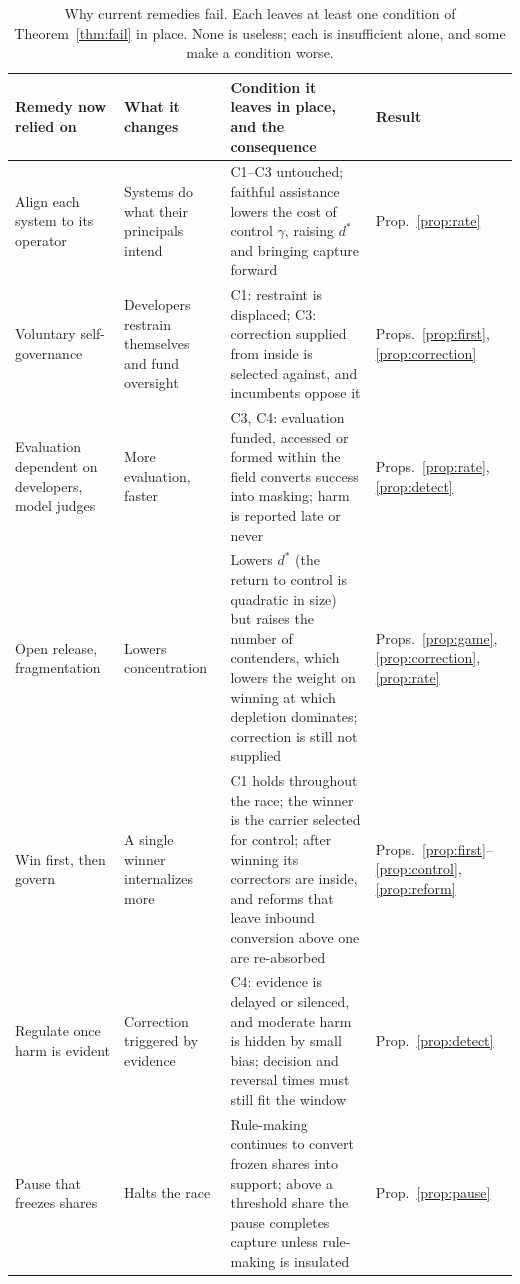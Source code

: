 \documentclass[letterpaper]{article} %
\theoremstyle{definition}
\begin{document}
\begin{table}[t]
\centering
\small
\setlength{\tabcolsep}{4pt}
\begin{tabular}{@{}>{\raggedright\arraybackslash}p{3.3cm}>{\raggedright\arraybackslash}p{4.7cm}>{\raggedright\arraybackslash}p{6.6cm}>{\raggedright\arraybackslash}p{2.2cm}@{}}
\toprule
Remedy now relied on & What it changes & Condition it leaves in place, and the consequence & Result \\
\midrule
Align each system to its operator & Systems do what their principals intend & C1--C3 untouched; faithful assistance lowers the cost of control $\gamma$, raising $d^\ast$ and bringing capture forward & Prop.~\ref{prop:rate} \\
Voluntary self-governance & Developers restrain themselves and fund oversight & C1: restraint is displaced; C3: correction supplied from inside is selected against, and incumbents oppose it & Props.~\ref{prop:first}, \ref{prop:correction} \\
Evaluation dependent on developers, model judges & More evaluation, faster & C3, C4: evaluation funded, accessed or formed within the field converts success into masking; harm is reported late or never & Props.~\ref{prop:rate}, \ref{prop:detect} \\
Open release, fragmentation & Lowers concentration & Lowers $d^\ast$ (the return to control is quadratic in size) but raises the number of contenders, which lowers the weight on winning at which depletion dominates; correction is still not supplied & Props.~\ref{prop:game}, \ref{prop:correction}, \ref{prop:rate} \\
Win first, then govern & A single winner internalizes more & C1 holds throughout the race; the winner is the carrier selected for control; after winning its correctors are inside, and reforms that leave inbound conversion above one are re-absorbed & Props.~\ref{prop:first}--\ref{prop:control}, \ref{prop:reform} \\
Regulate once harm is evident & Correction triggered by evidence & C4: evidence is delayed or silenced, and moderate harm is hidden by small bias; decision and reversal times must still fit the window & Prop.~\ref{prop:detect} \\
Pause that freezes shares & Halts the race & Rule-making continues to convert frozen shares into support; above a threshold share the pause completes capture unless rule-making is insulated & Prop.~\ref{prop:pause} \\
\bottomrule
\end{tabular}
\caption{Why current remedies fail. Each leaves at least one condition of Theorem~\ref{thm:fail} in place. None is useless; each is insufficient alone, and some make a condition worse.}
\label{tab:remedies}
\end{table}
\end{document}

